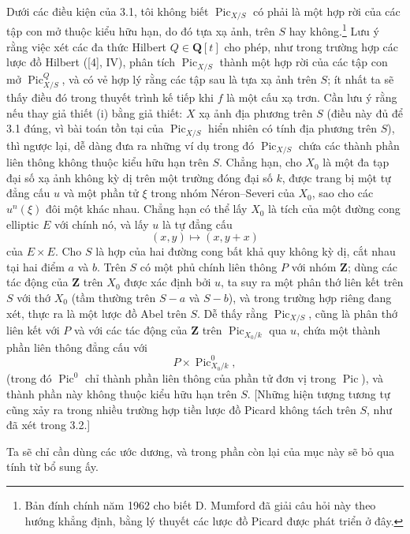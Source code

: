  Dưới các điều kiện của 3.1, tôi không biết
$\operatorname{Pic}_{X/S}$ có phải là một hợp rời của các tập con mở thuộc
kiểu hữu hạn, do đó tựa xạ ảnh, trên $S$ hay không.\footnote{Bản đính chính
năm 1962 cho biết D. Mumford đã giải câu hỏi này theo hướng khẳng định, bằng
lý thuyết các lược đồ Picard được phát triển ở đây.} Lưu ý rằng việc xét các
đa thức Hilbert $Q\in\mathbf Q[t]$ cho phép, như trong trường hợp các lược đồ
Hilbert ([4], IV), phân tích $\operatorname{Pic}_{X/S}$ thành một hợp rời của
các tập con mở $\operatorname{Pic}^{Q}_{X/S}$, và có vẻ hợp lý rằng các tập
sau là tựa xạ ảnh trên $S$; ít nhất ta sẽ thấy điều đó trong thuyết trình kế
tiếp khi $f$ là một cấu xạ trơn. Cần lưu ý rằng nếu thay giả thiết (i) bằng
giả thiết: $X$ xạ ảnh địa phương trên $S$ (điều này đủ để 3.1 đúng, vì bài toán
tồn tại của $\operatorname{Pic}_{X/S}$ hiển nhiên có tính địa phương trên
$S$), thì ngược lại, dễ dàng
đưa ra những ví dụ trong đó $\operatorname{Pic}_{X/S}$ chứa các thành phần
liên thông không thuộc kiểu hữu hạn trên $S$. Chẳng hạn, cho $X_0$ là một đa
tạp đại số xạ ảnh không kỳ dị trên một trường đóng đại số $k$, được trang bị
một tự đẳng cấu $u$ và một phần tử $\xi$ trong nhóm Néron--Severi của $X_0$,
sao cho các $u^n(\xi)$ đôi một khác nhau. Chẳng hạn có thể lấy $X_0$ là tích
của một đường cong elliptic $E$ với chính nó, và lấy $u$ là tự đẳng cấu
\[
(x,y)\longmapsto(x,y+x)
\]
của $E\times E$. Cho $S$ là hợp của hai đường cong bất khả quy không kỳ dị,
cắt nhau tại hai điểm $a$ và $b$. Trên $S$ có một phủ chính liên thông $P$ với
nhóm $\mathbf Z$; dùng các tác động của $\mathbf Z$ trên $X_0$ được xác định
bởi $u$, ta suy ra một phân thớ liên kết trên $S$ với thớ $X_0$ (tầm thường
trên $S-a$ và $S-b$), và trong trường hợp riêng đang xét, thực ra là một lược
đồ Abel trên $S$. Dễ thấy rằng $\operatorname{Pic}_{X/S}$, cũng là phân thớ
liên kết với $P$ và với các tác động của $\mathbf Z$ trên
$\operatorname{Pic}_{X_0/k}$ qua $u$, chứa một thành phần liên thông đẳng cấu
với
\[
P\times\operatorname{Pic}^{0}_{X_0/k},
\]
(trong đó $\operatorname{Pic}^{0}$ chỉ thành phần liên thông của phần tử đơn
vị trong $\operatorname{Pic}$), và thành phần này không thuộc kiểu hữu hạn
trên $S$. [Những hiện tượng tương tự cũng xảy ra trong nhiều trường hợp tiền
lược đồ Picard không tách trên $S$, như đã xét trong 3.2.]


Ta sẽ chỉ cần dùng các ước dương, và trong phần còn lại của mục này sẽ bỏ qua
tính từ bổ sung ấy.

